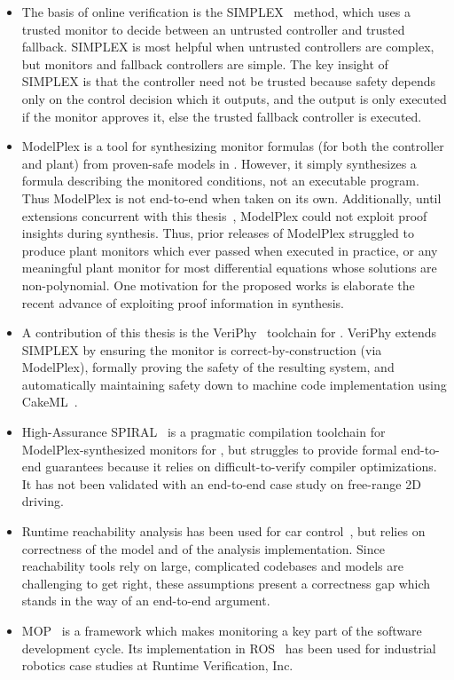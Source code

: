\documentclass[12pt]{cmuthesis}
\theoremstyle{definition}
\theoremstyle{remark}
\newcommand{\VeriPhy}{VeriPhy\xspace}
\newcommand{\ModelPlex}{ModelPlex\xspace}
\begin{document}
\begin{itemize}
\item The basis of online verification is the SIMPLEX~\cite{Krogh1998TheSA} method, which uses a trusted monitor to decide between an untrusted controller and trusted fallback.
  SIMPLEX is most helpful when untrusted controllers are complex, but monitors and fallback controllers are simple.
  The key insight of SIMPLEX is that the controller need not be trusted because safety depends only on the control decision which it outputs, and the output is only executed if the monitor approves it, else the trusted fallback controller is executed.
\item \ModelPlex is a tool for synthesizing \dL monitor formulas (for both the controller and plant) from proven-safe \dL models in \KeYmaeraX.
  However, it simply synthesizes a \dL formula describing the monitored conditions, not an executable program.
  Thus \ModelPlex is not end-to-end when taken on its own.
  Additionally, until extensions concurrent with this thesis~\cite{DBLP:conf/pldi/BohrerTMMP18}, \ModelPlex could not exploit proof insights during synthesis.
  Thus, prior releases of \ModelPlex struggled to produce plant monitors which ever passed when executed in practice, or any meaningful plant monitor for most differential equations whose solutions are non-polynomial.
  One motivation for the proposed works is elaborate the recent advance of exploiting proof information in synthesis.
\item A contribution of this thesis is the \VeriPhy~\cite{DBLP:conf/pldi/BohrerTMMP18} toolchain for \dL.
  \VeriPhy extends SIMPLEX by ensuring the monitor is correct-by-construction (via \ModelPlex), formally proving the safety of the resulting system, and automatically maintaining safety down to machine code implementation using CakeML~\cite{DBLP:conf/popl/KumarMNO14}.
\item High-Assurance SPIRAL~\cite{DBLP:journals/csm/FranchettiLMMGPPKMFJPV17} is a pragmatic compilation toolchain for \ModelPlex-synthesized monitors for \dL, 
  but struggles to provide formal end-to-end guarantees because it relies on difficult-to-verify compiler optimizations.
  It has not been validated with an end-to-end case study on free-range 2D driving.
\item Runtime reachability analysis has been used for car control~\cite{DBLP:journals/trob/AlthoffD14}, but relies on correctness of the model and of the analysis implementation.
Since reachability tools rely on large, complicated codebases and models are challenging to get right, these assumptions present a correctness gap which stands in the way of an end-to-end argument.
\item  MOP~\cite{DBLP:conf/oopsla/ChenR07} is a framework which makes monitoring a key part of the software development cycle.
  Its implementation in ROS~\cite{DBLP:conf/rv/HuangEZMLSR14} has been used for industrial robotics case studies at Runtime Verification, Inc.
\end{itemize}
\end{document}
